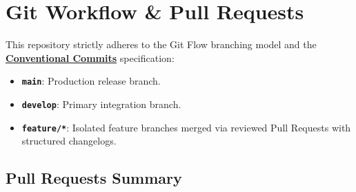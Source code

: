 \documentclass[10pt,a4paper]{article}
\begin{document}
\section{Git Workflow \& Pull Requests}

This repository strictly adheres to the Git Flow branching model and the \textbf{\href{https://www.conventionalcommits.org/}{Conventional Commits}} specification:
\begin{itemize}[leftmargin=1.5em]
    \item \textbf{\texttt{main}}: Production release branch.
    \item \textbf{\texttt{develop}}: Primary integration branch.
    \item \textbf{\texttt{feature/*}}: Isolated feature branches merged via reviewed Pull Requests with structured changelogs.
\end{itemize}

\subsection{Pull Requests Summary}
\end{document}
